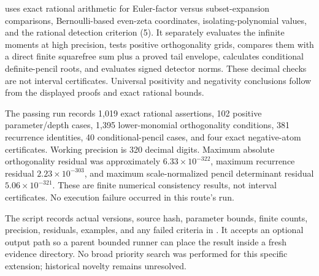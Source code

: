  uses exact rational arithmetic
for Euler-factor versus subset-expansion comparisons, Bernoulli-based
even-zeta coordinates, isolating-polynomial values, and the rational
detection criterion (5). It separately evaluates the infinite moments at
high precision, tests positive orthogonality grids, compares them with a
direct finite squarefree sum plus a proved tail envelope, calculates
conditional definite-pencil roots, and evaluates signed detector norms.
These decimal checks are not interval certificates. Universal positivity
and negativity conclusions follow from the displayed proofs and exact
rational bounds.

The passing run records 1,019 exact rational assertions, 102 positive
parameter/depth cases, 1,395 lower-monomial orthogonality conditions,
381 recurrence identities, 40 conditional-pencil cases, and four exact
negative-atom certificates. Working precision is 320 decimal digits.
Maximum absolute orthogonality residual was approximately
\(6.33\times10^{-322}\), maximum recurrence residual
\(2.23\times10^{-303}\), and maximum scale-normalized pencil determinant
residual \(5.06\times10^{-321}\). These are finite numerical consistency
results, not interval certificates. No execution failure occurred in
this route's run.

The script records actual versions, source hash, parameter bounds,
finite counts, precision, residuals, examples, and any failed criteria
in . It accepts an
optional output path so a parent bounded runner can place the result
inside a fresh evidence directory. No broad priority search was
performed for this specific extension; historical novelty remains
unresolved.

